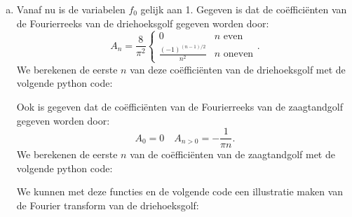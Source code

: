 \documentclass[12pt, dutch, a4paper]{article}
\theoremstyle{definition}
\newenvironment{code}{\captionsetup{type=listing}}{}
\begin{document}
\begin{enumerate}[(a)., wide]
  \item
  Vanaf nu is de variabelen $f_0$ gelijk aan 1. Gegeven is dat de coëfficiënten van de Fourierreeks van de driehoeksgolf gegeven worden door:
  \begin{equation} \label{trianglewave}
    A_n = \frac{8}{\pi^2} 
    \begin{cases}
      0 & n \text{ even} \\
      \frac{(-1)^{ (n-1)/2 }}{n^2} & n \text{ oneven}
    \end{cases}.
  \end{equation}
  We berekenen de eerste $n$ van deze coëfficiënten van de driehoeksgolf met de volgende python code:

  Ook is gegeven dat de coëfficiënten van de Fourierreeks van de zaagtandgolf gegeven worden door:
  \begin{equation} \label{sawtooth}
    A_0 = 0 \quad A_{n > 0} = -\frac{1}{\pi n}.
  \end{equation}
  We berekenen de eerste $n$ van de coëfficiënten van de zaagtandgolf met de volgende python code:

  \newpage

  We kunnen met deze functies en de volgende code een illustratie maken van de Fourier transform van de driehoeksgolf:


\end{enumerate}
\end{document}
